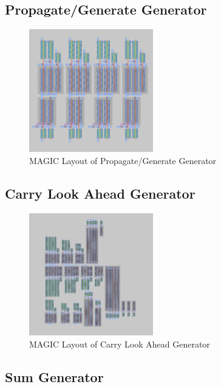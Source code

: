 \documentclass[conference]{IEEEtran}
\begin{document}
\subsection{Propagate/Generate Generator}

\begin{figure}[H]
    \centering
    \includegraphics[width=0.48\textwidth]{images/pg_gen_optimized_layout.png}
    \caption{MAGIC Layout of Propagate/Generate Generator}
\end{figure}

\subsection{Carry Look Ahead Generator}

\begin{figure}[H]
    \centering
    \includegraphics[width=0.48\textwidth]{images/cla_gen_cmos_layout.png}
    \caption{MAGIC Layout of Carry Look Ahead Generator}
\end{figure}

\subsection{Sum Generator}
\end{document}
